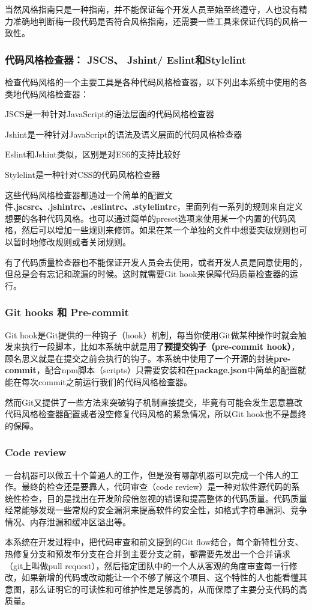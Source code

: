 当然风格指南只是一种指南，并不能保证每个开发人员至始至终遵守，人也没有精力准确地判断梅一段代码是否符合风格指南，还需要一些工具来保证代码的风格一致性。
\subsubsection{代码风格检查器： JSCS、 Jshint/ Eslint和Stylelint}
检查代码风格的一个主要工具是各种代码风格检查器，以下列出本系统中使用的各类地代码风格检查器：
\begin{itemize*}
  \item JSCS是一种针对JavaScript的语法层面的代码风格检查器
  \item Jshint是一种针对JavaScript的语法及语义层面的代码风格检查器
  \item Eslint和Jshint类似，区别是对ES6的支持比较好
  \item Stylelint是一种针对CSS的代码风格检查器
\end{itemize*}

这些代码风格检查器都通过一个简单的配置文件\textbf{.jscsrc、.jshintrc、.eslintrc、.stylelintrc}，里面列有一系列的规则来自定义想要的各种代码风格。也可以通过简单的preset选项来使用某一个内置的代码风格，然后可以增加一些规则来修饰。如果在某一个单独的文件中想要突破规则也可以暂时地修改规则或者关闭规则。

有了代码质量检查器也不能保证开发人员会去使用，或者开发人员是同意使用的，但总是会有忘记和疏漏的时候。这时就需要Git hook来保障代码质量检查器的运行。
\subsubsection{Git hooks 和 Pre-commit}
Git hook是Git提供的一种钩子（hook）机制，每当你使用Git做某种操作时就会触发来执行一段脚本，比如本系统中就是用了\textbf{预提交钩子（pre-commit hook）}，顾名思义就是在提交之前会执行的钩子。本系统中使用了一个开源的封装\textbf{pre-commit}，配合npm脚本（scripts）只需要安装和在\textbf{package.json}中简单的配置就能在每次commit之前运行我们的代码风格检查器。

然而Git又提供了一些方法来突破钩子机制直接提交，毕竟有可能会发生恶意篡改代码风格检查器配置或者没空修复代码风格的紧急情况，所以Git hook也不是最终的保障。
\subsubsection{Code review}
一台机器可以做五十个普通人的工作，但是没有哪部机器可以完成一个伟人的工作\supercite{hubbard2015one}。最终的检查还是要靠人，代码审查（code review）是一种对软件源代码的系统性检查，目的是找出在开发阶段倍忽视的错误和提高整体的代码质量。代码质量经常能够发现一些常规的安全漏洞来提高软件的安全性，如格式字符串漏洞、竞争情况、内存泄漏和缓冲区溢出等。

本系统在开发过程中，把代码审查和前文提到的Git flow结合，每个新特性分支、热修复分支和预发布分支在合并到主要分支之前，都需要先发出一个合并请求（git上叫做pull request），然后指定团队中的一个人从客观的角度审查每一行修改，如果新增的代码或改动能让一个不够了解这个项目、这个特性的人也能看懂其意图，那么证明它的可读性和可维护性是足够高的，从而保障了主要分支代码的高质量。

